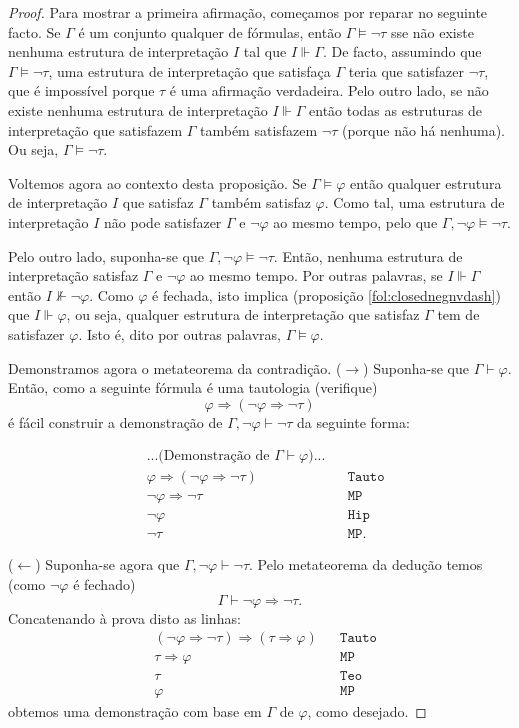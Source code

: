 \documentclass{report}
\theoremstyle{definition}
\theoremstyle{remark}
\newcommand{\imply}{\mathbin{\Rightarrow}}
\begin{document}
	\begin{proof}
	Para mostrar a primeira afirmação, começamos por reparar no seguinte facto. Se $\Gamma$ é um conjunto qualquer de fórmulas, então $\Gamma \vDash \neg \tau$ sse não existe nenhuma estrutura de interpretação $I$ tal que $I \Vdash \Gamma$. De facto, assumindo que $\Gamma \vDash \neg \tau$, uma estrutura de interpretação que satisfaça $\Gamma$ teria que satisfazer $\neg \tau$, que é impossível porque $\tau$ é uma afirmação verdadeira. Pelo outro lado, se não existe nenhuma estrutura de interpretação $I \Vdash \Gamma$ então todas as estruturas de interpretação que satisfazem $\Gamma$ também satisfazem $\neg \tau$ (porque não há nenhuma). Ou seja, $\Gamma \vDash \neg \tau$.

	Voltemos agora ao contexto desta proposição. Se $\Gamma \vDash \varphi$ então qualquer estrutura de interpretação $I$ que satisfaz $\Gamma$ também satisfaz $\varphi$. Como tal, uma estrutura de interpretação $I$ não pode satisfazer $\Gamma$ e $\neg \varphi$ ao mesmo tempo, pelo que $\Gamma, \neg \varphi \vDash \neg \tau$.

	Pelo outro lado, suponha-se que $\Gamma, \neg \varphi \vDash \neg \tau$. Então, nenhuma estrutura de interpretação satisfaz $\Gamma$ e $\neg \varphi$ ao mesmo tempo. Por outras palavras, se $I \Vdash \Gamma$ então $I \nVdash \neg \varphi$. Como $\varphi$ é fechada, isto implica (proposição \ref{fol:closednegnvdash}) que $I \Vdash \varphi$, ou seja, qualquer estrutura de interpretação que satisfaz $\Gamma$ tem de satisfazer $\varphi$. Isto é, dito por outras palavras, $\Gamma \vDash \varphi$.
	
	Demonstramos agora o metateorema da contradição. ($\rightarrow$) Suponha-se que $\Gamma \vdash \varphi$. Então, como a seguinte fórmula é uma tautologia (verifique)
	\[\varphi \imply (\neg \varphi \imply \neg \tau)\]
	é fácil construir a demonstração de $\Gamma, \neg \varphi \vdash \neg \tau$ da seguinte forma:
	
	\begin{align*}
	&\text{...(Demonstração de $\Gamma \vdash \varphi$)...}\\
	&\varphi \imply (\neg \varphi \imply \neg \tau)&&\texttt{Tauto}\\
	&\neg \varphi \imply \neg \tau&&\texttt{MP}\\
	&\neg \varphi&&\texttt{Hip}\\
	&\neg \tau&&\texttt{MP}.
	\end{align*}
	
	($\leftarrow$) Suponha-se agora que $\Gamma, \neg \varphi \vdash \neg \tau$. Pelo metateorema da dedução temos (como $\neg \varphi$ é fechado)
	\[\Gamma \vdash \neg \varphi \imply \neg \tau.\]
	Concatenando à prova disto as linhas:
	\begin{align*}
	&(\neg \varphi \imply \neg \tau) \imply (\tau \imply \varphi)&&\texttt{Tauto}\\
	&\tau \imply \varphi&&\texttt{MP}\\
	&\tau&&\texttt{Teo}\\
	&\varphi&&\texttt{MP}
	\end{align*}
	obtemos uma demonstração com base em $\Gamma$ de $\varphi$, como desejado.
	\end{proof}
	
\end{document}
